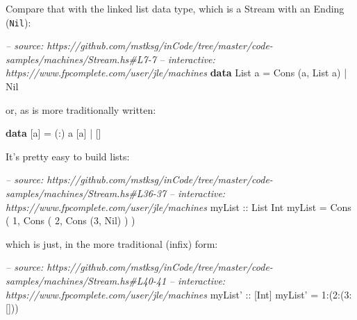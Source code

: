 \documentclass[]{article}
\newenvironment{Shaded}{}{}
\newcommand{\KeywordTok}[1]{\textcolor[rgb]{0.00,0.44,0.13}{\textbf{{#1}}}}
\newcommand{\DataTypeTok}[1]{\textcolor[rgb]{0.56,0.13,0.00}{{#1}}}
\newcommand{\DecValTok}[1]{\textcolor[rgb]{0.25,0.63,0.44}{{#1}}}
\newcommand{\CommentTok}[1]{\textcolor[rgb]{0.38,0.63,0.69}{\textit{{#1}}}}
\newcommand{\OtherTok}[1]{\textcolor[rgb]{0.00,0.44,0.13}{{#1}}}
\newcommand{\FunctionTok}[1]{\textcolor[rgb]{0.02,0.16,0.49}{{#1}}}
\newcommand{\NormalTok}[1]{{#1}}
\begin{document}
Compare that with the linked list data type, which is a Stream with an Ending
(\texttt{Nil}):

\begin{Shaded}
\begin{Highlighting}[]
\CommentTok{-- source: https://github.com/mstksg/inCode/tree/master/code-samples/machines/Stream.hs#L7-7}
\CommentTok{-- interactive: https://www.fpcomplete.com/user/jle/machines}
\KeywordTok{data} \DataTypeTok{List} \NormalTok{a }\FunctionTok{=} \DataTypeTok{Cons} \NormalTok{(a, }\DataTypeTok{List} \NormalTok{a) }\FunctionTok{|} \DataTypeTok{Nil}
\end{Highlighting}
\end{Shaded}

or, as is more traditionally written:

\begin{Shaded}
\begin{Highlighting}[]
\KeywordTok{data} \NormalTok{[a] }\FunctionTok{=} \NormalTok{(}\FunctionTok{:}\NormalTok{) a [a] }\FunctionTok{|} \NormalTok{[]}
\end{Highlighting}
\end{Shaded}

It's pretty easy to build lists:

\begin{Shaded}
\begin{Highlighting}[]
\CommentTok{-- source: https://github.com/mstksg/inCode/tree/master/code-samples/machines/Stream.hs#L36-37}
\CommentTok{-- interactive: https://www.fpcomplete.com/user/jle/machines}
\OtherTok{myList ::} \DataTypeTok{List} \DataTypeTok{Int}
\NormalTok{myList }\FunctionTok{=} \DataTypeTok{Cons} \NormalTok{( }\DecValTok{1}\NormalTok{, }\DataTypeTok{Cons} \NormalTok{( }\DecValTok{2}\NormalTok{, }\DataTypeTok{Cons} \NormalTok{(}\DecValTok{3}\NormalTok{, }\DataTypeTok{Nil}\NormalTok{) ) )}
\end{Highlighting}
\end{Shaded}

which is just, in the more traditional (infix) form:

\begin{Shaded}
\begin{Highlighting}[]
\CommentTok{-- source: https://github.com/mstksg/inCode/tree/master/code-samples/machines/Stream.hs#L40-41}
\CommentTok{-- interactive: https://www.fpcomplete.com/user/jle/machines}
\OtherTok{myList' ::} \NormalTok{[}\DataTypeTok{Int}\NormalTok{]}
\NormalTok{myList' }\FunctionTok{=} \DecValTok{1}\FunctionTok{:}\NormalTok{(}\DecValTok{2}\FunctionTok{:}\NormalTok{(}\DecValTok{3}\FunctionTok{:}\NormalTok{[]))}
\end{Highlighting}
\end{Shaded}
\end{document}
